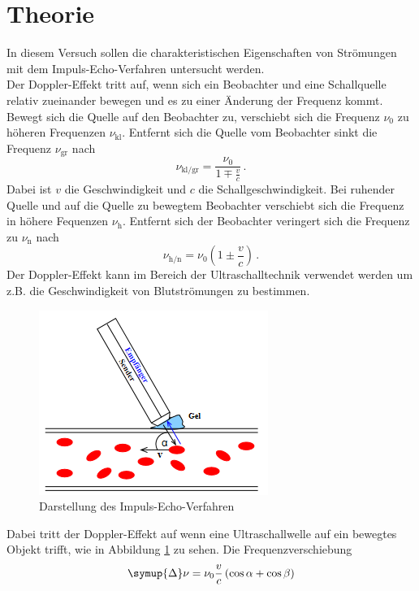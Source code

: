 \section{Theorie}
\label{sec:Theorie}
In diesem Versuch sollen die charakteristischen Eigenschaften von Strömungen mit dem Impuls-Echo-Verfahren untersucht werden.\\
Der Doppler-Effekt tritt auf, wenn sich ein Beobachter und eine Schallquelle relativ zueinander bewegen und es zu einer Änderung der Frequenz kommt.
Bewegt sich die Quelle auf den Beobachter zu, verschiebt sich die Frequenz $\nu_0$ zu höheren Frequenzen $\nu_\text{kl}$. Entfernt sich die Quelle vom Beobachter sinkt die Frequenz $\nu_\text{gr}$ nach
\begin{equation}
    \nu_\text{kl/gr}=\frac{\nu_0}{1\mp \frac{v}{c}} \, .
\end{equation}
Dabei ist $v$ die Geschwindigkeit und $c$ die Schallgeschwindigkeit.
Bei ruhender Quelle und auf die Quelle zu bewegtem Beobachter verschiebt sich die Frequenz in höhere Fequenzen $\nu_\text{h}$.
Entfernt sich der Beobachter veringert sich die Frequenz zu $\nu_\text{n}$ nach 
\begin{equation}
    \nu_\text{h/n}= \nu_0 \left(1 \pm \frac{v}{c}\right) \, .
\end{equation}
Der Doppler-Effekt kann im Bereich der Ultraschalltechnik verwendet werden um z.B. die Geschwindigkeit von Blutströmungen zu bestimmen. 
\begin{figure}
    \centering
    \includegraphics[scale=0.4]{pics/Blut.png}
    \caption{Darstellung des Impuls-Echo-Verfahren \cite{v903}}
    \label{fig:IEV}
  \end{figure}
Dabei tritt der Doppler-Effekt auf wenn eine Ultraschallwelle auf ein bewegtes Objekt trifft, wie in Abbildung \ref{fig:IEV} zu sehen. Die Frequenzverschiebung 
\begin{equation}
    \symup{\Delta}\nu=\nu_0 \frac{v}{c}\left(\cos \alpha + \cos \beta \right)
\end{equation}
